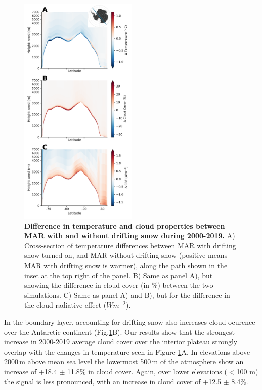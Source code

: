 \documentclass[draft]{agujournal2019}
\begin{document}
\begin{figure}[H]
	\includegraphics[width=0.5\textwidth]{cross_section_lt_new.png}
	\caption{\textbf{Difference in temperature and cloud properties between MAR with and without drifting snow during 2000-2019.} A) Cross-section of temperature differences between MAR with drifting snow turned on, and MAR without drifting snow (positive means MAR with drifting snow is warmer), along the path shown in the inset at the top right of the panel. B) Same as panel A), but showing the difference in cloud cover (in \%) between the two simulations. C) Same as panel A) and B), but for the difference in the cloud radiative effect ($Wm^{-2}$). }
	\label{fig:Test}
\end{figure}

In the boundary layer, accounting for drifting snow also increases cloud ocurence over the Antarctic continent (Fig.\ref{fig:Test}B). Our results show that the strongest increase in 2000-2019 average cloud cover over the interior plateau strongly overlap with the changes in temperature seen in Figure \ref{fig:Test}A. In elevations above 2000\,m above mean sea level the lowermost 500\,m of the atmosphere show an increase of +18.4 $\pm$ 11.8\% in cloud cover. Again, over lower elevations ($<$100 m) the signal is less pronounced, with an increase in cloud cover of +12.5 $\pm$ 8.4\%.
\end{document}
